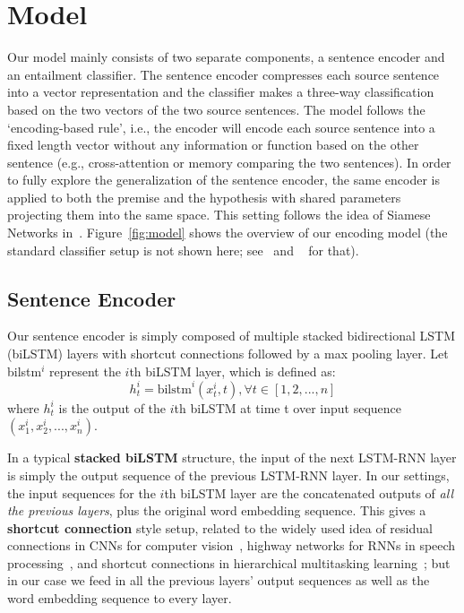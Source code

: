 \documentclass[11pt,letterpaper]{article}
\begin{document}
\section{Model}
Our model mainly consists of two separate components, a sentence encoder and an entailment classifier. The sentence encoder compresses each source sentence into a vector representation and the classifier makes a three-way classification based on the two vectors of the two source sentences. The model follows the `encoding-based rule', i.e., the encoder will encode each source sentence into a fixed length vector without any information or function based on the other sentence (e.g., cross-attention or memory comparing the two sentences). In order to fully explore the generalization of the sentence encoder, the same encoder is applied to both the premise and the hypothesis with shared parameters projecting them into the same space. This setting follows the idea of Siamese Networks in~. Figure~\ref{fig:model} shows the overview of our encoding model (the standard classifier setup is not shown here; see~ and ~ for that).



\subsection{Sentence Encoder}
Our sentence encoder is simply composed of multiple stacked bidirectional LSTM (biLSTM) layers with shortcut connections followed by a max pooling layer.
Let bilstm$^i$ represent the $i$th biLSTM layer, which is defined as:
\begin{equation}
h_t^i = \mathrm{bilstm}^i(x_t^i,t),\forall t \in [1,2,...,n]
\end{equation}
where $h_t^i$ is the output of the $i$th biLSTM at time t over input sequence $(x_1^i, x_2^i, ..., x_n^i)$.

In a typical \textbf{stacked biLSTM} structure, the input of the next LSTM-RNN layer is simply the output sequence of the previous LSTM-RNN layer. In our settings, the input sequences for the $i$th biLSTM layer are the concatenated outputs of \emph{all the previous layers}, plus the original word embedding sequence. This gives a \textbf{shortcut connection} style setup, related to the widely used idea of residual connections in CNNs for computer vision~\cite{he2016deep}, highway networks for RNNs in speech processing~\cite{zhang2016highway}, and shortcut connections in hierarchical multitasking learning~\cite{hashimoto2016joint}; but in our case we feed in all the previous layers' output sequences as well as the word embedding sequence to every layer.
\end{document}
